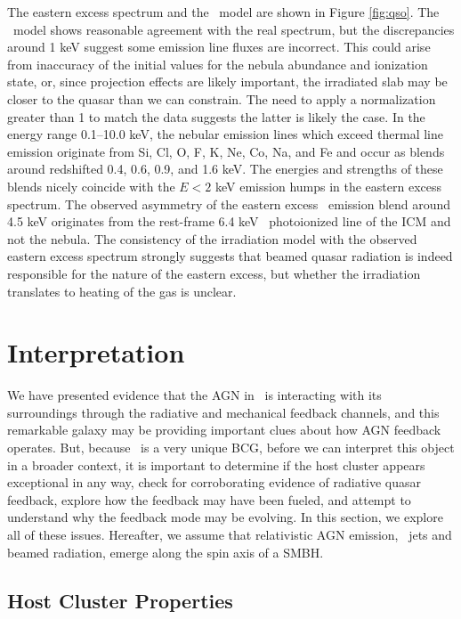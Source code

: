 \documentclass[useAMS,usenatbib]{mn2e}
\begin{document}
The eastern excess spectrum and the \cloudy\ model are shown in Figure
\ref{fig:qso}. The \cloudy\ model shows reasonable agreement with the
real spectrum, but the discrepancies around 1 keV suggest some
emission line fluxes are incorrect. This could arise from inaccuracy
of the initial values for the nebula abundance and ionization state,
or, since projection effects are likely important, the irradiated slab
may be closer to the quasar than we can constrain. The need to apply a
normalization greater than 1 to match the data suggests the latter is
likely the case. In the energy range 0.1--10.0 keV, the nebular
emission lines which exceed thermal line emission originate from Si,
Cl, O, F, K, Ne, Co, Na, and Fe and occur as blends around redshifted
0.4, 0.6, 0.9, and 1.6 keV. The energies and strengths of these blends
nicely coincide with the $E < 2$ keV emission humps in the eastern
excess spectrum. The observed asymmetry of the eastern excess
\feka\ emission blend around 4.5 keV originates from the rest-frame
6.4 keV \feka\ photoionized line of the ICM and not the nebula. The
consistency of the irradiation model with the observed eastern excess
spectrum strongly suggests that beamed quasar radiation is indeed
responsible for the nature of the eastern excess, but whether the
irradiation translates to heating of the gas is unclear.

\section{Interpretation}
\label{sec:interp}

We have presented evidence that the AGN in \irs\ is interacting with
its surroundings through the radiative and mechanical feedback
channels, and this remarkable galaxy may be providing important clues
about how AGN feedback operates. But, because \irs\ is a very unique
BCG, before we can interpret this object in a broader context, it is
important to determine if the host cluster appears exceptional in any
way, check for corroborating evidence of radiative quasar feedback,
explore how the feedback may have been fueled, and attempt to
understand why the feedback mode may be evolving. In this section, we
explore all of these issues. Hereafter, we assume that relativistic
AGN emission, \eg\ jets and beamed radiation, emerge along the spin
axis of a SMBH.

\subsection{Host Cluster Properties}
\end{document}
